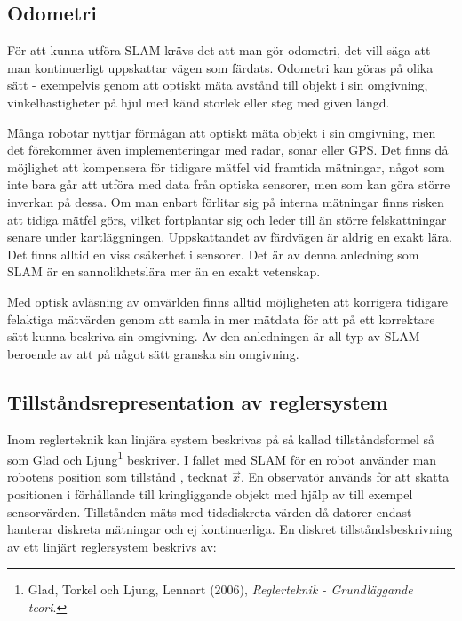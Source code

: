 \documentclass[a4paper,12pt,fleqn]{article}
\begin{document}
\subsection{Odometri}

För att kunna utföra SLAM krävs det att man gör odometri, det vill säga att man kontinuerligt uppskattar vägen som färdats. Odometri kan göras på olika sätt - exempelvis genom att optiskt mäta avstånd till objekt i sin omgivning, vinkelhastigheter på hjul med känd storlek eller steg med given längd. 

Många robotar nyttjar förmågan att optiskt mäta objekt i sin omgivning, men det förekommer även implementeringar med radar, sonar eller GPS. Det finns då möjlighet att kompensera för tidigare mätfel vid framtida mätningar, något som inte bara går att utföra med data från optiska sensorer, men som kan göra större inverkan på dessa. Om man enbart förlitar sig på interna mätningar finns risken att tidiga mätfel görs, vilket fortplantar sig och leder till än större felskattningar senare under kartläggningen. 
Uppskattandet av färdvägen är aldrig en exakt lära. Det finns alltid en viss osäkerhet i sensorer. Det är av denna anledning som SLAM är en sannolikhetslära mer än en exakt vetenskap. 

Med optisk avläsning av omvärlden finns alltid möjligheten att korrigera tidigare felaktiga mätvärden genom att samla in mer mätdata för att på ett korrektare sätt kunna beskriva sin omgivning. Av den anledningen är all typ av SLAM beroende av att på något sätt granska sin omgivning. 

\newpage

\subsection{Tillståndsrepresentation av reglersystem}

Inom reglerteknik kan linjära system beskrivas på så kallad tillståndsformel så som Glad och Ljung\footnote{Glad, Torkel och Ljung, Lennart (2006), \textit{Reglerteknik - Grundläggande teori}.} beskriver. I fallet med SLAM för en robot använder man robotens position som tillstånd , tecknat $\vec{x}$. En observatör används för att skatta positionen i förhållande till kringliggande objekt med hjälp av till exempel sensorvärden. Tillstånden mäts med tidsdiskreta värden då datorer endast hanterar diskreta mätningar och ej kontinuerliga. En diskret tillståndsbeskrivning av ett linjärt reglersystem beskrivs av: 
\end{document}
